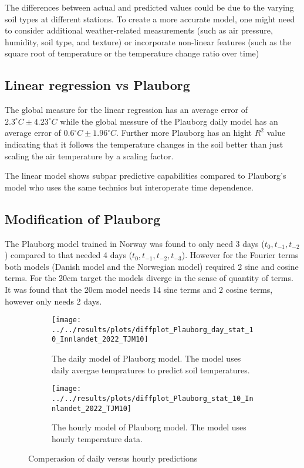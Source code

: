 The differences between actual and predicted values could be due to the varying soil types at different stations. To create a more accurate model, one might need to consider additional weather-related measurements (such as air pressure, humidity, soil type, and texture) or incorporate non-linear features (such as the square root of temperature or the temperature change ratio over time)
 

\subsection{Linear regression vs Plauborg}

The global measure for the linear regression has an average error of $2.3^\circ C \pm 4.23^\circ C$ while the global messure of the Plauborg daily model has an average error of $0.6^\circ C \pm 1.96^\circ C$. Further more Plauborg has an hight $R^2$ value indicating that it follows the temperature changes in the soil better than just scaling the air temperature by a scaling factor.

The linear model shows subpar predictive capabilities compared to Plauborg's model who uses the same technics but interoperate time dependence. 

\subsection{Modification of Plauborg}

The Plauborg model trained in Norway was found to only need 3 days ($t_0,t_{-1},t_{-2}$) compared to \cite{plauborg_simple_2002} that needed 4 days ($t_0,t_{-1},t_{-2},t_{-3}$). However for the Fourier terms both models (Danish model and the Norwegian model) required 2 sine and cosine terms. For the 20cm target the models diverge in the sense of quantity of terms. It was found that the 20cm model needs 14 sine terms and 2 cosine terms, however only needs 2 days.
\begin{figure}[H]
	\begin{subfigure}{\textwidth}
		\centering
		\texttt{[image: ../../results/plots/diffplot\_Plauborg\_day\_stat\_10\_Innlandet\_2022\_TJM10]}
		\caption[Plauborg daily TJM10]{The daily model of Plauborg model. The model uses daily avergae tempratures to predict soil temperatures.}
		\label{fig:diffplotplauborgdaystat10innlandet2022tjm10}
	\end{subfigure}
	\begin{subfigure}{\textwidth}
		\centering
		\texttt{[image: ../../results/plots/diffplot\_Plauborg\_stat\_10\_Innlandet\_2022\_TJM10]}
		\caption[Plauborg hourly TJM10]{The hourly model of Plauborg model. The model uses hourly temperature data.}
		\label{fig:diffplotplauborgstat10innlandet2022tjm10}
	\end{subfigure}
	\caption{Comperasion of daily versus hourly predictions}
\end{figure}


